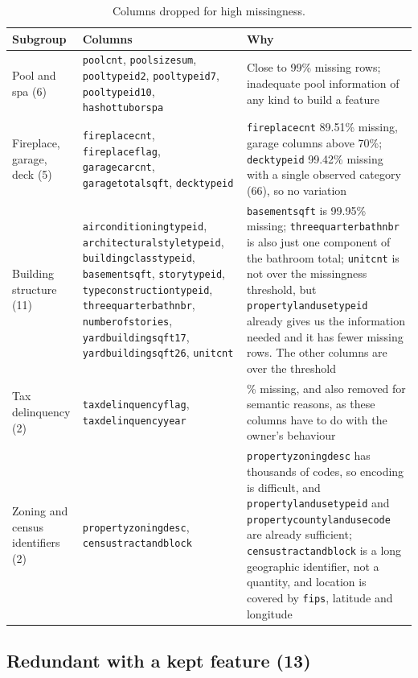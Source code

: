 \documentclass[sigconf,nonacm,10pt]{acmart}
\begin{document}
\begin{table}[t]
\caption{Columns dropped for high missingness.}
\footnotesize
\begin{tabularx}{\textwidth}{@{}p{2.9cm}>{\raggedright\arraybackslash}p{6.0cm}>{\raggedright\arraybackslash}X@{}}
\toprule
Subgroup & Columns & Why \\
\midrule
Pool and spa (6) & \texttt{poolcnt}, \texttt{poolsizesum}, \texttt{pooltypeid2}, \texttt{pooltypeid7}, \texttt{pooltypeid10}, \texttt{hashottuborspa} & Close to 99\% missing rows; inadequate pool information of any kind to build a feature \\
\addlinespace
Fireplace, garage, deck (5) & \texttt{fireplacecnt}, \texttt{fireplaceflag}, \texttt{garagecarcnt}, \texttt{garagetotalsqft}, \texttt{decktypeid} & \texttt{fireplacecnt} 89.51\% missing, garage columns above 70\%; \texttt{decktypeid} 99.42\% missing with a single observed category (66), so no variation \\
\addlinespace
Building structure (11) & \texttt{airconditioningtypeid}, \texttt{architecturalstyletypeid}, \texttt{buildingclasstypeid}, \texttt{basementsqft}, \texttt{storytypeid}, \texttt{typeconstructiontypeid}, \texttt{threequarterbathnbr}, \texttt{numberofstories}, \texttt{yardbuildingsqft17}, \texttt{yardbuildingsqft26}, \texttt{unitcnt} & \texttt{basementsqft} is 99.95\% missing; \texttt{threequarterbathnbr} is also just one component of the bathroom total; \texttt{unitcnt} is not over the missingness threshold, but \texttt{propertylandusetypeid} already gives us the information needed and it has fewer missing rows. The other columns are over the threshold \\
\addlinespace
Tax delinquency (2) & \texttt{taxdelinquencyflag}, \texttt{taxdelinquencyyear} & 98.1\% missing, and also removed for semantic reasons, as these columns have to do with the owner's behaviour \\
\addlinespace
Zoning and census identifiers (2) & \texttt{propertyzoningdesc}, \texttt{censustractandblock} & \texttt{propertyzoningdesc} has thousands of codes, so encoding is difficult, and \texttt{propertylandusetypeid} and \texttt{propertycountylandusecode} are already sufficient; \texttt{censustractandblock} is a long geographic identifier, not a quantity, and location is covered by \texttt{fips}, latitude and longitude \\
\bottomrule
\end{tabularx}
\end{table}

\subsection{Redundant with a kept feature (13)}
\end{document}
